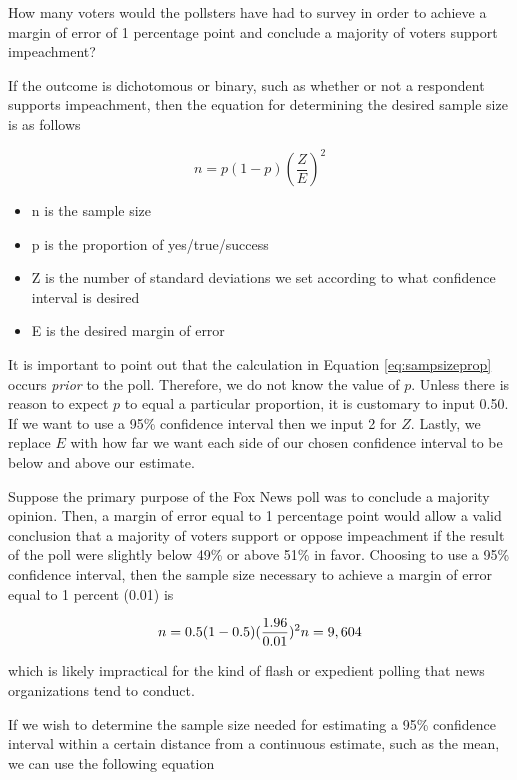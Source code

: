 \documentclass[
]{book}
\providecommand{\tightlist}{%
  \setlength{\itemsep}{0pt}\setlength{\parskip}{0pt}}
\begin{document}
How many voters would the pollsters have had to survey in order to achieve a margin of error of 1 percentage point and conclude a majority of voters support impeachment?

If the outcome is dichotomous or binary, such as whether or not a respondent supports impeachment, then the equation for determining the desired sample size is as follows

\begin{equation}
n=p(1-p)({\frac{Z}{E}})^2
\label{eq:sampsizeprop}
\end{equation}

\begin{itemize}
\tightlist
\item
  n is the sample size
\item
  p is the proportion of yes/true/success
\item
  Z is the number of standard deviations we set according to what confidence interval is desired
\item
  E is the desired margin of error
\end{itemize}

It is important to point out that the calculation in Equation \eqref{eq:sampsizeprop} occurs \emph{prior} to the poll. Therefore, we do not know the value of \(p\). Unless there is reason to expect \(p\) to equal a particular proportion, it is customary to input 0.50. If we want to use a 95\% confidence interval then we input 2 for \(Z\). Lastly, we replace \(E\) with how far we want each side of our chosen confidence interval to be below and above our estimate.

Suppose the primary purpose of the Fox News poll was to conclude a majority opinion. Then, a margin of error equal to 1 percentage point would allow a valid conclusion that a majority of voters support or oppose impeachment if the result of the poll were slightly below 49\% or above 51\% in favor. Choosing to use a 95\% confidence interval, then the sample size necessary to achieve a margin of error equal to 1 percent (0.01) is

\begin{equation}
n=0.5(1-0.5)({\frac{1.96}{0.01}})^2\\
n=9,604
\end{equation}

which is likely impractical for the kind of flash or expedient polling that news organizations tend to conduct.

If we wish to determine the sample size needed for estimating a 95\% confidence interval within a certain distance from a continuous estimate, such as the mean, we can use the following equation
\end{document}
